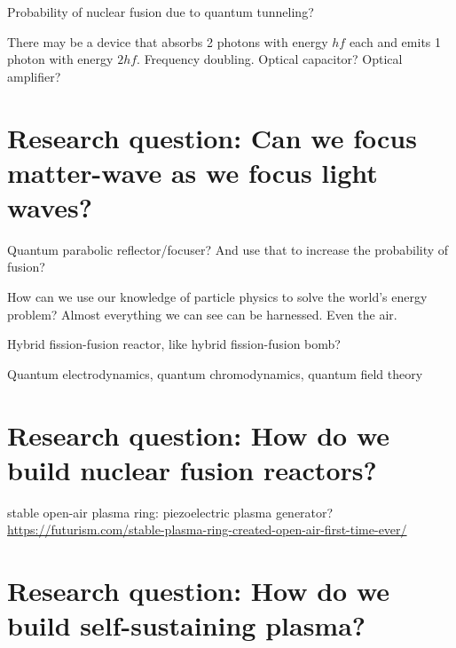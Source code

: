 
Probability of nuclear fusion due to quantum tunneling?

There may be a device that absorbs 2 photons with energy \(hf\) each and emits 1 photon with energy \(2hf\).
Frequency doubling.
Optical capacitor?
Optical amplifier?

\section{Research question: Can we focus matter-wave as we focus light waves?}

Quantum parabolic reflector/focuser?
And use that to increase the probability of fusion?

How can we use our knowledge of particle physics to solve the world's energy problem?
Almost everything we can see can be harnessed.
Even the air.

Hybrid fission-fusion reactor, like hybrid fission-fusion bomb?

Quantum electrodynamics, quantum chromodynamics, quantum field theory


\section{Research question: How do we build nuclear fusion reactors?}

stable open-air plasma ring:
piezoelectric plasma generator?
\url{https://futurism.com/stable-plasma-ring-created-open-air-first-time-ever/}


\section{Research question: How do we build self-sustaining plasma?}



